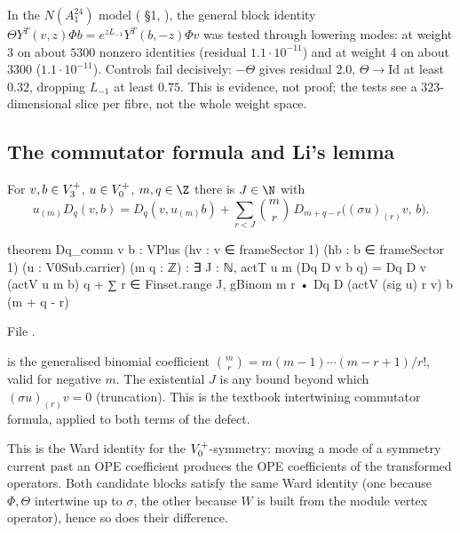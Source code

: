 \begin{warning}[title={Evidence: Numerical evidence at weights 3 and 4}]
In the $N(A_1^{24})$ model ( \S1, ),
the general block identity $\Theta Y^T(v,z)\Phi b=e^{zL_{-1}}Y^T(b,-z)\Phi v$ was tested through
lowering modes: at weight 3 on about $5300$ nonzero identities (residual $1.1\cdot10^{-11}$) and at
weight 4 on about $3300$ ($1.1\cdot10^{-11}$).  Controls fail decisively: $-\Theta$ gives residual $2.0$,
$\Theta\to\mathrm{Id}$ at least $0.32$, dropping $L_{-1}$ at least $0.75$.  This is evidence, not proof;
the tests see a $323$-dimensional slice per fibre, not the whole weight space.
\end{warning}

\subsection{The commutator formula and Li's lemma}

\begin{proposition}\label{ch14:prop:Dqcomm}
For $v,b\in V_3^{+}$, $u\in V_0^{+}$, $m,q\in\Z$ there is $J\in\N$ with
\begin{equation*}
  u_{(m)}D_q(v,b)=D_q(v,u_{(m)}b)+\sum_{r<J}\binom{m}{r}\,D_{m+q-r}\bigl((\sigma u)_{(r)}v,\,b\bigr).
\end{equation*}
\end{proposition}
\begin{leancode}
theorem Dq_comm {v b : VPlus} (hv : v ∈ frameSector 1) (hb : b ∈ frameSector 1)
    (u : V0Sub.carrier) (m q : ℤ) :
    ∃ J : ℕ, actT u m (Dq D v b q) = Dq D v (actV u m b) q
      + ∑ r ∈ Finset.range J, gBinom m r • Dq D (actV (sig u) r v) b (m + q - r)
\end{leancode}
File .

\begin{dictionary}
 is the generalised binomial coefficient $\binom mr=m(m-1)\cdots(m-r+1)/r!$, valid for
negative $m$.  The existential $J$ is any bound beyond which $(\sigma u)_{(r)}v=0$ (truncation).  This is
the textbook intertwining commutator formula, applied to both terms of the defect.
\end{dictionary}

\begin{physics}
This is the Ward identity for the $V_0^{+}$-symmetry: moving a mode of a symmetry current past an
OPE coefficient produces the OPE coefficients of the transformed operators.  Both candidate blocks
satisfy the same Ward identity (one because $\Phi,\Theta$ intertwine up to $\sigma$, the other because
$W$ is built from the module vertex operator), hence so does their difference.
\end{physics}

